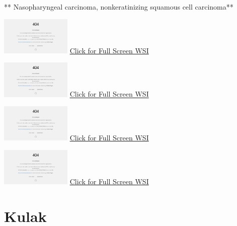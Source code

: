 \documentclass[
  letterpaper,
  paper=6in:9in,
  pagesize=pdftex,
  headinclude=on,
  footinclude=on,
  12pt]{scrbook}
\begin{document}
** Nasopharyngeal carcinoma, nonkeratinizing squamous cell carcinoma**

\href{https://images.patolojiatlasi.com/nasopharynx-nonkeratinizing-scc/HE.html}{\includegraphics[width=0.25\textwidth,height=\textheight]{./screenshots/nasopharynx-nonkeratinizing-scc-HE_screenshot.png}}
\href{https://images.patolojiatlasi.com/nasopharynx-nonkeratinizing-scc/HE.html}{Click
for Full Screen WSI}

\href{https://images.patolojiatlasi.com/nasopharynx-nonkeratinizing-scc/HE.html}{\includegraphics[width=0.25\textwidth,height=\textheight]{./screenshots/nasopharynx-nonkeratinizing-scc-HE_screenshot.png}}
\href{https://images.patolojiatlasi.com/nasopharynx-nonkeratinizing-scc/panCK.html}{Click
for Full Screen WSI}

\href{https://images.patolojiatlasi.com/nasopharynx-nonkeratinizing-scc/HE.html}{\includegraphics[width=0.25\textwidth,height=\textheight]{./screenshots/nasopharynx-nonkeratinizing-scc-HE_screenshot.png}}
\href{https://images.patolojiatlasi.com/nasopharynx-nonkeratinizing-scc/p63.html}{Click
for Full Screen WSI}

\href{https://images.patolojiatlasi.com/nasopharynx-nonkeratinizing-scc/HE.html}{\includegraphics[width=0.25\textwidth,height=\textheight]{./screenshots/nasopharynx-nonkeratinizing-scc-HE_screenshot.png}}
\href{https://images.patolojiatlasi.com/nasopharynx-nonkeratinizing-scc/EBER.html}{Click
for Full Screen WSI}

\hypertarget{sec-kulak}{%
\chapter{Kulak}\label{sec-kulak}}
\end{document}
